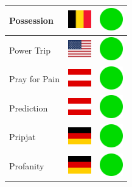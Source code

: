 \documentclass[12pt, a4paper, twoside]{report}
\begin{document}
\begin{center}
\begin{longtable}{|p{5cm}|p{2cm}|p{2cm}|}
 Possession                                                 & \includegraphics[width=1cm]{../img/flags/be} &   \includegraphics[width=1cm]{../likes/y} \\ \hline
 Power Trip                                                 & \includegraphics[width=1cm]{../img/flags/us} &   \includegraphics[width=1cm]{../likes/y} \\ \hline
 Pray for Pain                                              & \includegraphics[width=1cm]{../img/flags/at} &   \includegraphics[width=1cm]{../likes/y} \\ \hline
 Prediction                                                 & \includegraphics[width=1cm]{../img/flags/at} &   \includegraphics[width=1cm]{../likes/y} \\ \hline
 Pripjat                                                    & \includegraphics[width=1cm]{../img/flags/de} &   \includegraphics[width=1cm]{../likes/y} \\ \hline
 Profanity                                                  & \includegraphics[width=1cm]{../img/flags/de} &   \includegraphics[width=1cm]{../likes/y} \\ \hline

\end{longtable}
\end{center}
\end{document}
